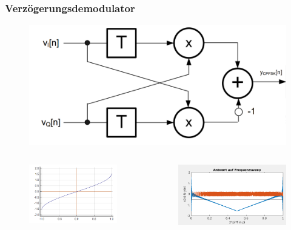 \documentclass{beamer}
\begin{document}
\begin{frame}
	\frametitle{Verzögerungsdemodulator}
	\begin{figure}
		\centering
		\includegraphics[height=0.4\textheight]{images/fm_demod_no_asin}
		\label{fig:fmdemodnoasin}
	\end{figure}

	\begin{columns}
		\begin{column}{0.5\textwidth}
			\begin{figure}
				\centering
				\includegraphics[width=0.8\linewidth]{images/asin}
				\label{fig:asin}
			\end{figure}
			
		\end{column}
		\begin{column}{0.5\textwidth}
			\begin{figure}
				\centering
				\includegraphics[width=0.8\linewidth]{images/fm_demod_sweep}
				\label{fig:fmdemodsweep}
			\end{figure}
			
		\end{column}
	\end{columns}
\end{frame}
\end{document}
